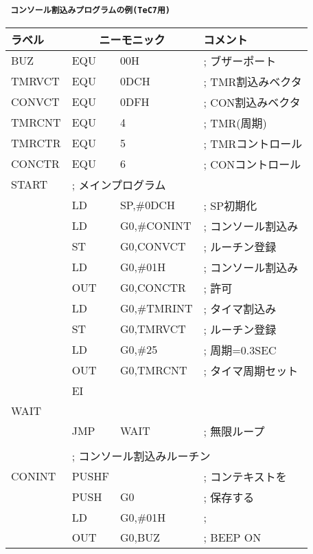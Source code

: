 \begin{center}
{\small\tt
{\bf コンソール割込みプログラムの例(TeC7用)}
\begin{tabular}{|l|l l l|} \hline
ラベル & \multicolumn{2}{|c}{ニーモニック} & コメント\\
\hline
BUZ    & EQU    & 00H               & ; ブザーポート  \\
TMRVCT & EQU    & 0DCH              & ; TMR割込みベクタ  \\
CONVCT & EQU    & 0DFH              & ; CON割込みベクタ  \\
TMRCNT & EQU    & 4                 & ; TMR(周期)  \\
TMRCTR & EQU    & 5                 & ; TMRコントロール  \\
CONCTR & EQU    & 6                 & ; CONコントロール  \\
START  & \multicolumn{3}{|l|}{; メインプログラム}     \\ 
       & LD     & SP,\#0DCH         & ; SP初期化  \\
       & LD     & G0,\#CONINT       & ; コンソール割込み  \\
       & ST     & G0,CONVCT         & ; ルーチン登録  \\
       & LD     & G0,\#01H          & ; コンソール割込み  \\
       & OUT    & G0,CONCTR         & ; 許可  \\
       & LD     & G0,\#TMRINT       & ; タイマ割込み  \\
       & ST     & G0,TMRVCT         & ; ルーチン登録  \\
       & LD     & G0,\#25           & ; 周期=0.3SEC  \\
       & OUT    & G0,TMRCNT         & ; タイマ周期セット  \\
       & EI     &                   &   \\
WAIT   &        &                   &   \\
       & JMP    & WAIT              & ; 無限ループ  \\
       &        &                   &   \\
       & \multicolumn{3}{|l|}{; コンソール割込みルーチン}       \\
CONINT & PUSHF  &                   & ; コンテキストを  \\
       & PUSH   & G0                & ; 保存する  \\
       & LD     & G0,\#01H          & ;   \\
       & OUT    & G0,BUZ            & ; BEEP ON  \\

\end{tabular}}
\end{center}
